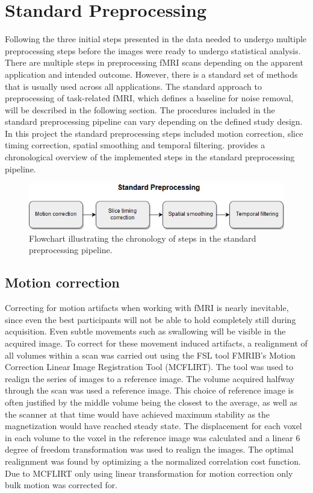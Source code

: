 \section{Standard Preprocessing} \label{sec:std}

Following the three initial steps presented in  the data needed to undergo multiple preprocessing steps before the images were ready to undergo statistical analysis. There are multiple steps in preprocessing fMRI scans depending on the apparent application and intended outcome. However, there is a standard set of methods that is usually used across all applications. \cite{Moayedi2018} The standard approach to preprocessing of task-related fMRI, which defines a baseline for noise removal, will be described in the following section. The procedures included in the standard preprocessing pipeline can vary depending on the defined study design. In this project the standard preprocessing steps included motion correction, slice timing correction, spatial smoothing and temporal filtering.  provides a chronological overview of the implemented steps in the standard preprocessing pipeline.      

\begin{figure}[H]                 
	\includegraphics[width=.7\textwidth]{figures/bMethods/Standard_preprocessing} 
	\caption{Flowchart illustrating the chronology of steps in the standard preprocessing pipeline.}
	\label{fig:meth:std} 
\end{figure}

\subsection{Motion correction}

Correcting for motion artifacts when working with fMRI is nearly inevitable, since even the best participants will not be able to hold completely still during acquisition. Even subtle movements such as swallowing will be visible in the acquired image. \cite{Poldrack2011} To correct for these movement induced artifacts, a realignment of all volumes within a scan was carried out using the FSL tool FMRIB's Motion Correction Linear Image Registration Tool (MCFLIRT). \cite{Jenkinson2002}
The tool was used to realign the series of images to a reference image. The volume acquired halfway through the scan was used a reference image. This choice of reference image is often justified by the middle volume being the closest to the average, as well as the scanner at that time would have achieved maximum stability as the magnetization would have reached steady state. \cite{Poldrack2011} The displacement for each voxel in each volume to the voxel in the reference image was calculated and a linear 6 degree of freedom transformation was used to realign the images. The optimal realignment was found by optimizing a the normalized correlation cost function. Due to MCFLIRT only using linear transformation for motion correction only bulk motion was corrected for. \cite{Jenkinson2002}


